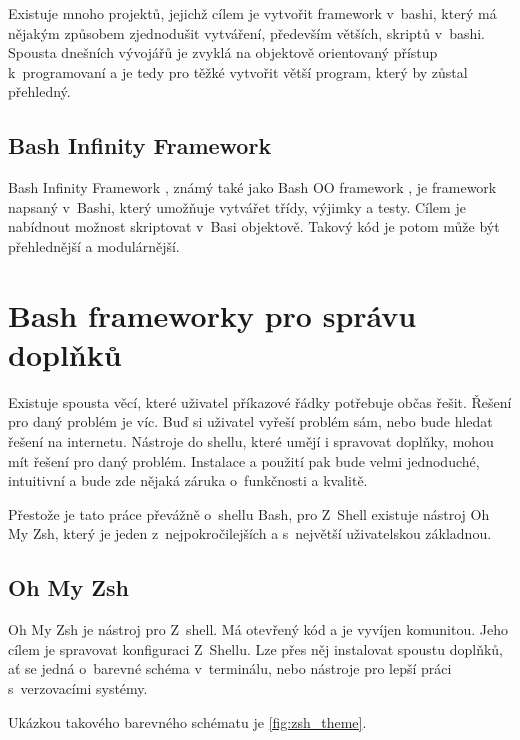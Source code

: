 \documentclass[thesis=M,czech]{FITthesis}[2012/06/26]
\begin{document}
Existuje mnoho projektů, jejichž cílem je vytvořit framework v~bashi, který má nějakým způsobem zjednodušit vytváření, především větších, skriptů v~bashi. Spousta dnešních vývojářů je zvyklá na objektově orientovaný přístup k~programovaní a je tedy pro těžké vytvořit větší program, který by zůstal přehledný.

\subsection{Bash Infinity Framework}
Bash Infinity Framework \cite{bashinfinity}, známý také jako Bash OO framework \cite{bashooframework}, je framework napsaný v~Bashi, který umožňuje vytvářet třídy, výjimky a testy. Cílem je nabídnout možnost skriptovat v~Basi objektově. Takový kód je potom může být přehlednější a modulárnější.

%
%
%
%
%

\section{Bash frameworky pro správu doplňků}

Existuje spousta věcí, které uživatel příkazové řádky potřebuje občas řešit. Řešení pro daný problém je víc. Buď si uživatel vyřeší problém sám, nebo bude hledat řešení na internetu. Nástroje do shellu, které umějí i spravovat doplňky, mohou mít řešení pro daný problém. Instalace a použití pak bude velmi jednoduché, intuitivní a bude zde nějaká záruka o~funkčnosti a kvalitě.

Přestože je tato práce převážně o~shellu Bash, pro Z~Shell existuje nástroj Oh My Zsh, který je jeden z~nejpokročilejších a s~největší uživatelskou základnou.

%
%
%
\subsection{Oh My Zsh}

Oh My Zsh \cite{ohmyzsh} je nástroj pro Z~shell. Má otevřený kód a je vyvíjen komunitou. Jeho cílem je spravovat konfiguraci Z~Shellu. Lze přes něj instalovat spoustu doplňků, ať se jedná o~barevné schéma v~terminálu, nebo nástroje pro lepší práci s~verzovacími systémy.

Ukázkou takového barevného schématu je \ref{fig:zsh_theme}.
\end{document}
